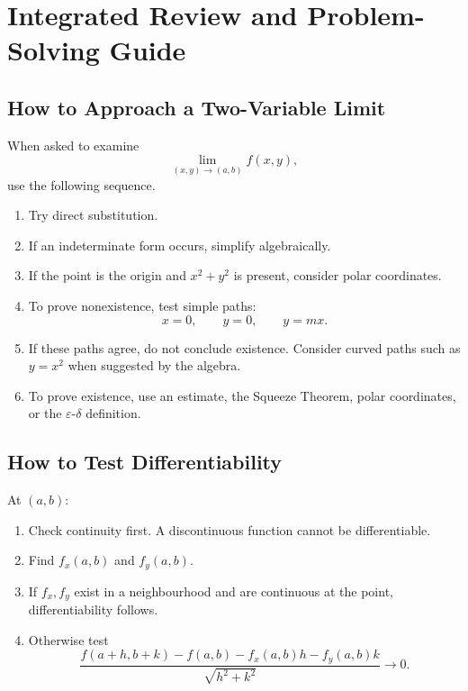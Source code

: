 \documentclass[11pt,oneside]{book}
\theoremstyle{studentthm}
\theoremstyle{definition}
\newcommand{\eps}{\varepsilon}
\begin{document}
\chapter{Integrated Review and Problem-Solving Guide}

\section{How to Approach a Two-Variable Limit}

When asked to examine
\[
\lim_{(x,y)\to(a,b)}f(x,y),
\]
use the following sequence.

\begin{enumerate}
\item Try direct substitution.
\item If an indeterminate form occurs, simplify algebraically.
\item If the point is the origin and \(x^2+y^2\) is present, consider
polar coordinates.
\item To prove nonexistence, test simple paths:
\[
x=0,\qquad y=0,\qquad y=mx.
\]
\item If these paths agree, do not conclude existence. Consider curved
paths such as \(y=x^2\) when suggested by the algebra.
\item To prove existence, use an estimate, the Squeeze Theorem, polar
coordinates, or the \(\eps\)-\(\delta\) definition.
\end{enumerate}

\section{How to Test Differentiability}

At \((a,b)\):

\begin{enumerate}
\item Check continuity first. A discontinuous function cannot be
differentiable.
\item Find \(f_x(a,b)\) and \(f_y(a,b)\).
\item If \(f_x,f_y\) exist in a neighbourhood and are continuous at
the point, differentiability follows.
\item Otherwise test
\[
\frac{
f(a+h,b+k)-f(a,b)-f_x(a,b)h-f_y(a,b)k
}{
\sqrt{h^2+k^2}
}
\to0.
\]
\end{enumerate}
\end{document}
